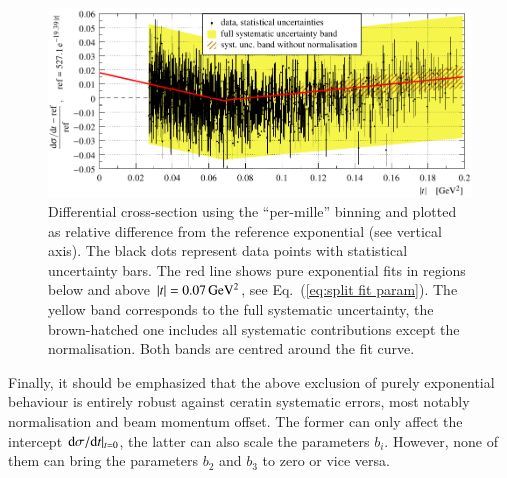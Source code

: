 \begin{figure}
\begin{center}
\includegraphics{fig/t_dist_rel_with_split_fit.pdf}
\vskip-4mm
\caption{%
Differential cross-section using the ``per-mille'' binning and plotted as relative difference from the reference exponential (see vertical axis). The black dots represent data points with statistical uncertainty bars. The red line shows pure exponential fits in regions below and above $|t| = 0.07\,{\rm GeV^2}$, see Eq.~(\ref{eq:split fit param}). The yellow band corresponds to the full systematic uncertainty, the brown-hatched one includes all systematic contributions except the normalisation. Both bands are centred around the fit curve.
}
\label{fig:data rel cpb0.001}
\end{center}
\end{figure}

Finally, it should be emphasized that the above exclusion of purely exponential behaviour is entirely robust against ceratin systematic errors, most notably normalisation and beam momentum offset. The former can only affect the intercept ${\rm d}\sigma/{\rm d} t|_{t=0}$, the latter can also scale the parameters $b_i$. However, none of them can bring the parameters $b_2$ and $b_3$ to zero or vice versa.
